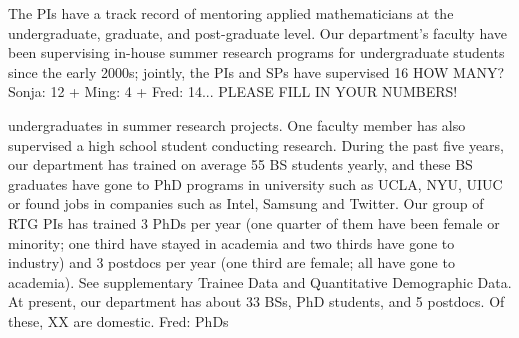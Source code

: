 \documentclass[11pt]{NSFamsart}
\newcommand{\numUG}{33\xspace}
\newcommand{\numPostDoc}{5\xspace}
\newcommand{\FredNote}[1]{{\color{blue} Fred: #1}}
\begin{document}
The PIs have a track record of mentoring  applied mathematicians at the undergraduate, graduate, and post-graduate level. 
Our department's faculty have been supervising in-house summer research programs for undergraduate students since the early 2000s; jointly, the PIs and SPs have supervised 16 {\color{red}HOW MANY? Sonja: 12 + Ming: 4 + Fred: 14... PLEASE FILL IN YOUR NUMBERS!}{
undergraduates in summer research projects. 
One faculty member has also supervised a high school student conducting research. 
During the past five years, our department has trained on average 55 BS students yearly, and these BS graduates have gone to PhD programs in university such as UCLA, NYU, UIUC or found jobs in companies such as Intel, Samsung and Twitter. Our group of RTG PIs has trained 3 PhDs per year (one quarter of them have been female or minority; one third have stayed in academia and two thirds have gone to industry)  and 3 postdocs per year (one third are female; all have gone to academia).  See supplementary Trainee Data and Quantitative Demographic Data. 
At present, our department has about \numUG BSs, \numPhD PhD students, and \numPostDoc postdocs. 
{\color{red}Of these, XX  are domestic. }
\FredNote{PhDs}


}
\end{document}
